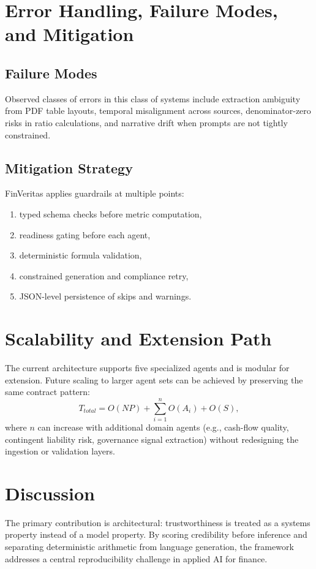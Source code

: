 \documentclass[conference]{IEEEtran}
\begin{document}
\section{Error Handling, Failure Modes, and Mitigation}
\subsection{Failure Modes}
Observed classes of errors in this class of systems include extraction ambiguity from PDF table layouts, temporal misalignment across sources, denominator-zero risks in ratio calculations, and narrative drift when prompts are not tightly constrained.

\subsection{Mitigation Strategy}
FinVeritas applies guardrails at multiple points:
\begin{enumerate}
    \item typed schema checks before metric computation,
    \item readiness gating before each agent,
    \item deterministic formula validation,
    \item constrained generation and compliance retry,
    \item JSON-level persistence of skips and warnings.
\end{enumerate}

\section{Scalability and Extension Path}
The current architecture supports five specialized agents and is modular for extension. Future scaling to larger agent sets can be achieved by preserving the same contract pattern:
\begin{equation}
T_{total}=O(NP)+\sum_{i=1}^{n}O(A_i)+O(S),
\end{equation}
where $n$ can increase with additional domain agents (e.g., cash-flow quality, contingent liability risk, governance signal extraction) without redesigning the ingestion or validation layers.

\section{Discussion}
The primary contribution is architectural: trustworthiness is treated as a systems property instead of a model property. By scoring credibility before inference and separating deterministic arithmetic from language generation, the framework addresses a central reproducibility challenge in applied AI for finance.
\end{document}
